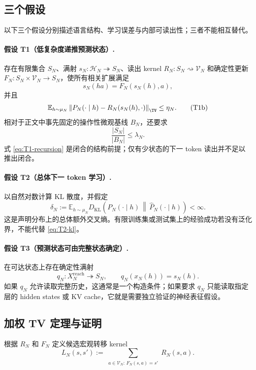 \subsection{三个假设}

以下三个假设分别描述语言结构、学习误差与内部可读出性；三者不能相互替代。

\paragraph{假设 T1（低复杂度递推预测状态）.}
存在有限集合 $S_N$、满射 $s_N:\mathcal H_N\twoheadrightarrow S_N$、读出 kernel
$R_N:S_N\rightsquigarrow\mathcal V_N$ 和确定性更新
$F_N:S_N\times\mathcal V_N\to S_N$，使所有相关扩展满足
\[
 s_N(ha)=F_N(s_N(h),a),
 \tag{T1a}\label{eq:T1-recursion}
\]
并且
\[
 \mathbb E_{h\sim\mu_N}
 \left\|P_N(\cdot\mid h)-R_N(s_N(h),\cdot)\right\|_{\TV}
 \le \eta_N.
 \tag{T1b}\label{eq:T1-readout}
\]
相对于正文中事先固定的操作性微观基线 $B_N$，还要求
\[
 \frac{|S_N|}{|B_N|}\le\lambda_N.
 \tag{T1c}\label{eq:T1-complexity}
\]
式 \eqref{eq:T1-recursion} 是闭合的结构前提；仅有少状态的下一 token 读出并不足以推出闭合。

\paragraph{假设 T2（总体下一 token 学习）.}
以自然对数计算 KL 散度，并假定
\[
 \delta_N
 :=\mathbb E_{h\sim\mu_N}
 D_{\mathrm{KL}}\!\left(
 P_N(\cdot\mid h)\,\middle\|\,
 \widehat P_N(\cdot\mid h)
 \right)<\infty.
 \tag{T2}\label{eq:T2-kl}
\]
这是声明分布上的总体额外交叉熵。有限训练集或测试集上的经验成功若没有泛化界，不能代替 \eqref{eq:T2-kl}。

\paragraph{假设 T3（预测状态可由完整状态确定）.}
在可达状态上存在确定性满射
\[
 q_N:X_N^{\mathrm{reach}}\twoheadrightarrow S_N,
 \qquad q_N(x_N(h))=s_N(h).
 \tag{T3}\label{eq:T3-readout}
\]
如果 $q_N$ 允许读取完整历史，这通常是一个构造条件；如果要求 $q_N$ 只能读取指定层的 hidden states 或 KV cache，它就是需要独立验证的神经表征假设。

\subsection{加权 TV 定理与证明}

根据 $R_N$ 和 $F_N$ 定义候选宏观转移 kernel
\[
 L_N(s,s')
 :=\sum_{\substack{a\in\mathcal V_N:\,F_N(s,a)=s'}}R_N(s,a).
 \tag{S.1}\label{eq:transformer-macro-kernel}
\]

